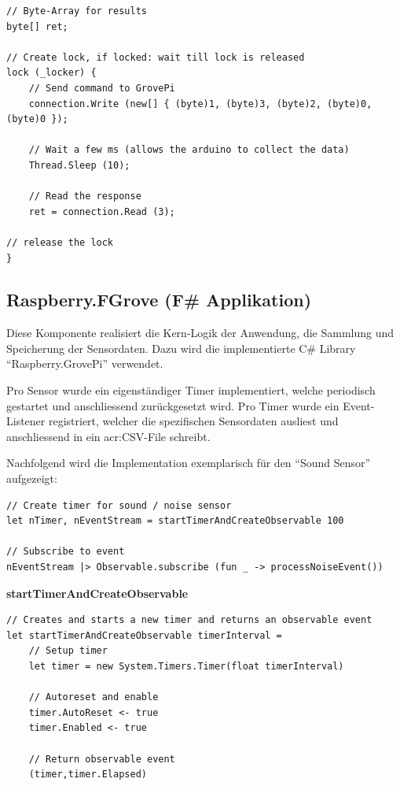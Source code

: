\begin{lstlisting}
// Byte-Array for results
byte[] ret; 

// Create lock, if locked: wait till lock is released
lock (_locker) { 
	// Send command to GrovePi
	connection.Write (new[] { (byte)1, (byte)3, (byte)2, (byte)0, (byte)0 }); 
	
	// Wait a few ms (allows the arduino to collect the data)
	Thread.Sleep (10); 
	
	// Read the response
	ret = connection.Read (3); 
	
// release the lock
} 
\end{lstlisting}


\subsection{Raspberry.FGrove (F\# Applikation)}
\label{sec:AnalyseCollection:application}
Diese Komponente realisiert die Kern-Logik der Anwendung, die Sammlung und Speicherung der Sensordaten. Dazu wird die implementierte C\# Library "`Raspberry.GrovePi"' verwendet.

Pro Sensor wurde ein eigenständiger Timer implementiert, welche periodisch gestartet und anschliessend zurückgesetzt wird. Pro Timer wurde ein Event-Listener registriert, welcher die spezifischen Sensordaten ausliest und anschliessend in ein \gls{acr:CSV}-File schreibt.

Nachfolgend wird die Implementation exemplarisch für den "`Sound Sensor"' aufgezeigt:
\begin{lstlisting}
// Create timer for sound / noise sensor
let nTimer, nEventStream = startTimerAndCreateObservable 100 

// Subscribe to event
nEventStream |> Observable.subscribe (fun _ -> processNoiseEvent())
\end{lstlisting}

\textbf{startTimerAndCreateObservable}
\begin{lstlisting}
// Creates and starts a new timer and returns an observable event
let startTimerAndCreateObservable timerInterval =
    // Setup timer
    let timer = new System.Timers.Timer(float timerInterval)

    // Autoreset and enable
    timer.AutoReset <- true
    timer.Enabled <- true

    // Return observable event
    (timer,timer.Elapsed)
\end{lstlisting} 

